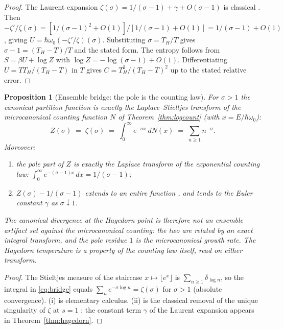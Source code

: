\documentclass[11pt,a4paper]{article}
\theoremstyle{plain}
\newtheorem{proposition}[theorem]{Proposition}
\theoremstyle{definition}
\theoremstyle{remark}
\begin{document}
\begin{proof}
The Laurent expansion $\zeta(\sigma)=1/(\sigma-1)+\gamma+O(\sigma-1)$ is classical
\cite{titchmarsh1986}. Then
$-\zeta'/\zeta(\sigma)=[1/(\sigma-1)^{2}+O(1)]/[1/(\sigma-1)+O(1)]=1/(\sigma-1)+O(1)$, giving
$U=\hbar\omega_{0}(-\zeta'/\zeta)(\sigma)$. Substituting $\sigma=T_{H}/T$ gives
$\sigma-1=(T_{H}-T)/T$ and the stated form. The entropy follows from
$S=\beta U+\log Z$ with $\log Z=-\log(\sigma-1)+O(1)$. Differentiating $U=T T_{H}/(T_{H}-T)$
in $T$ gives $C=T_{H}^{2}/(T_{H}-T)^{2}$ up to the stated relative error.
\end{proof}

\begin{proposition}[Ensemble bridge: the pole is the counting law]\label{prop:bridge}
For $\sigma>1$ the canonical partition function is exactly the Laplace--Stieltjes transform
of the microcanonical counting function $N$ of Theorem~\ref{thm:logcount} (with
$x=E/\hbar\omega_{0}$):
\begin{equation}\label{eq:bridge}
Z(\sigma)\;=\;\zeta(\sigma)\;=\;\int_{0}^{\infty}e^{-\sigma x}\,dN(x)
\;=\;\sum_{n\geq1}n^{-\sigma}.
\end{equation}
Moreover:
\begin{enumerate}[leftmargin=1.6em]
\item the pole part of $Z$ is exactly the Laplace transform of the exponential counting law:
$\int_{0}^{\infty}e^{-(\sigma-1)x}\,dx=1/(\sigma-1)$;
\item $Z(\sigma)-1/(\sigma-1)$ extends to an entire function \cite{titchmarsh1986}, and tends
to the Euler constant $\gamma$ as $\sigma\downarrow1$.
\end{enumerate}
The canonical divergence at the Hagedorn point is therefore not an ensemble artifact set
against the microcanonical counting: the two are related by an exact integral transform, and
the pole residue $1$ \emph{is} the microcanonical growth rate. The Hagedorn temperature is a
property of the counting law itself, read on either transform.
\end{proposition}

\begin{proof}
The Stieltjes measure of the staircase $x\mapsto\lfloor e^{x}\rfloor$ is
$\sum_{n\geq1}\delta_{\log n}$, so the integral in \eqref{eq:bridge} equals
$\sum_{n}e^{-\sigma\log n}=\zeta(\sigma)$ for $\sigma>1$ (absolute convergence). (i) is
elementary calculus. (ii) is the classical removal of the unique singularity of $\zeta$ at
$s=1$ \cite{titchmarsh1986}; the constant term $\gamma$ of the Laurent expansion appears in
Theorem~\ref{thm:hagedorn}.
\end{proof}
\end{document}
